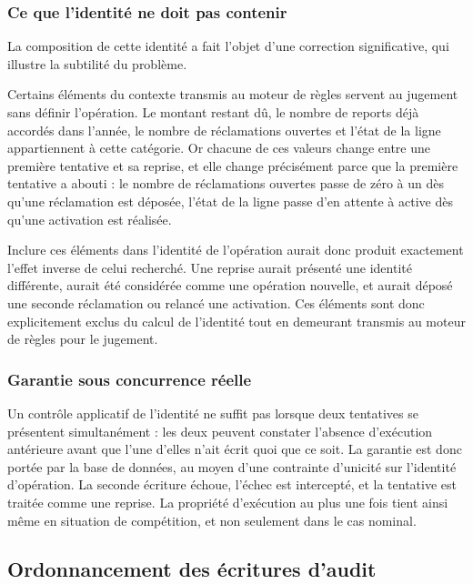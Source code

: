 \subsubsection{Ce que l'identité ne doit pas contenir}

La composition de cette identité a fait l'objet d'une correction significative, qui illustre la subtilité du problème.

Certains éléments du contexte transmis au moteur de règles servent au jugement sans définir l'opération. Le montant restant dû, le nombre de reports déjà accordés dans l'année, le nombre de réclamations ouvertes et l'état de la ligne appartiennent à cette catégorie. Or chacune de ces valeurs change entre une première tentative et sa reprise, et elle change précisément parce que la première tentative a abouti : le nombre de réclamations ouvertes passe de zéro à un dès qu'une réclamation est déposée, l'état de la ligne passe d'en attente à active dès qu'une activation est réalisée.

Inclure ces éléments dans l'identité de l'opération aurait donc produit exactement l'effet inverse de celui recherché. Une reprise aurait présenté une identité différente, aurait été considérée comme une opération nouvelle, et aurait déposé une seconde réclamation ou relancé une activation. Ces éléments sont donc explicitement exclus du calcul de l'identité tout en demeurant transmis au moteur de règles pour le jugement.

\subsubsection{Garantie sous concurrence réelle}

Un contrôle applicatif de l'identité ne suffit pas lorsque deux tentatives se présentent simultanément : les deux peuvent constater l'absence d'exécution antérieure avant que l'une d'elles n'ait écrit quoi que ce soit. La garantie est donc portée par la base de données, au moyen d'une contrainte d'unicité sur l'identité d'opération. La seconde écriture échoue, l'échec est intercepté, et la tentative est traitée comme une reprise. La propriété d'exécution au plus une fois tient ainsi même en situation de compétition, et non seulement dans le cas nominal.

\subsection{Ordonnancement des écritures d'audit}

